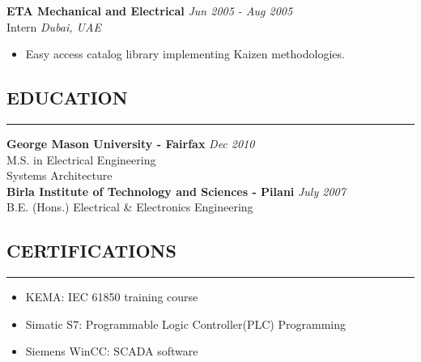 \documentclass{article}
\begin{document}
    {\bf ETA Mechanical and Electrical} \hfill {\em Jun 2005 - Aug 2005} \\
    Intern \hfill {\em Dubai, UAE} \\
    \begin{itemize}
    \item Easy access catalog library implementing Kaizen methodologies.
    \end{itemize}
    \bigskip

%
\subsection*{\MakeUppercase{\bf Education}}
    \hrule
    \bigskip
    {\bf George Mason University - Fairfax} \hfill {\em Dec 2010} \\ 
    M.S. in Electrical Engineering \\
    Systems Architecture \bigskip \\

    {\bf Birla Institute of Technology and Sciences - Pilani}
    \hfill {\em July 2007} \\ 
    B.E. (Hons.) Electrical \& Electronics Engineering \bigskip \\

%
\subsection*{\MakeUppercase{\bf Certifications}}
    \hrule
    \bigskip
    \begin{itemize}
    \item KEMA: IEC 61850 training course
    \item Simatic S7: Programmable Logic Controller(PLC) Programming
    \item Siemens WinCC: SCADA software
    \end{itemize}
    \bigskip
\end{document}
